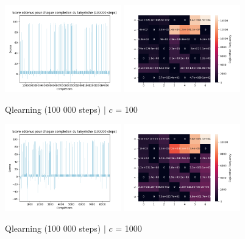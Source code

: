 \documentclass{article}
\begin{document}
\begin{figure}[H]
    \centering
    {%
        \includegraphics[width=0.45\textwidth]{src/qlearning/bonus/bonus100.png}
    }\hfill
    {%
        \includegraphics[width=0.45\textwidth]{src/qlearning/bonus/bonus100heatmap.png}
    }
    \caption{Qlearning (100 000 steps) $|$ $c$ = 100}
    \label{fig:bonus100}
\end{figure}

\begin{figure}[H]
    \centering
    {%
        \includegraphics[width=0.45\textwidth]{src/qlearning/bonus/bonus1000.png}
    }\hfill
    {%
        \includegraphics[width=0.45\textwidth]{src/qlearning/bonus/bonus1000heatmap.png}
    }
    \caption{Qlearning (100 000 steps) $|$ $c$ = 1000}
    \label{fig:bonus1000}
\end{figure}
\end{document}
